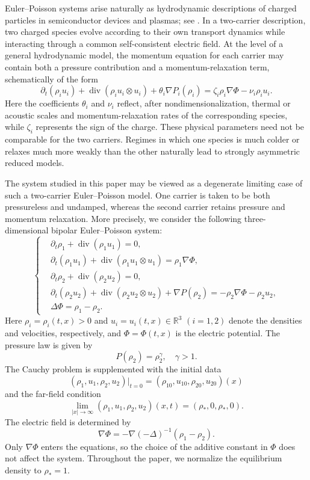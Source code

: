 \documentclass[10pt,reqno]{amsart}
\numberwithin{equation}{section}
\begin{document}
Euler--Poisson systems arise naturally as hydrodynamic descriptions of charged particles in semiconductor devices and plasmas; see \cite{MRS90}. In a two-carrier description, two charged species evolve according to their own transport dynamics while interacting through a common self-consistent electric field. At the level of a general hydrodynamic model, the momentum equation for each carrier may contain both a pressure contribution and a momentum-relaxation term, schematically of the form
\[
\partial_t(\rho_i u_i) +\operatorname{div}(\rho_i u_i\otimes u_i) +\theta_i\nabla P_i(\rho_i) =\zeta_i\rho_i\nabla\Phi-\nu_i\rho_i u_i.
\]
Here the coefficients $\theta_i$ and $\nu_i$ reflect, after nondimensionalization, thermal or acoustic scales and momentum-relaxation rates of the corresponding species, while $\zeta_i$ represents the sign of the charge. These physical parameters need not be comparable for the two carriers. Regimes in which one species is much colder or relaxes much more weakly than the other naturally lead to strongly asymmetric reduced models.

The system studied in this paper may be viewed as a degenerate limiting case of such a two-carrier Euler--Poisson model. One carrier is taken to be both pressureless and undamped, whereas the second carrier retains pressure and momentum relaxation. More precisely, we consider the following three-dimensional bipolar Euler--Poisson system:
\begin{equation}\label{main1}
\left\{
\begin{aligned}
&\partial_t \rho_1+\operatorname{div}(\rho_1u_1)=0,\\
&\partial_t(\rho_1u_1)+\operatorname{div}(\rho_1u_1\otimes u_1) =\rho_1\nabla\Phi,\\
&\partial_t \rho_2+\operatorname{div}(\rho_2u_2)=0,\\
&\partial_t(\rho_2u_2)+\operatorname{div}(\rho_2u_2\otimes u_2) +\nabla P(\rho_2) =-\rho_2\nabla\Phi-\rho_2u_2,\\
&\Delta\Phi=\rho_1-\rho_2.
\end{aligned}
\right.
\end{equation}
Here $\rho_i=\rho_i(t,x)>0$ and $u_i=u_i(t,x)\in\mathbb R^3$ $(i=1,2)$ denote the densities and velocities, respectively, and $\Phi=\Phi(t,x)$ is the electric potential. The pressure law is given by
\[
P(\rho_2)=\rho_2^\gamma,\quad \gamma>1.
\]
The Cauchy problem is supplemented with the initial data
\[
(\rho_1,u_1,\rho_2,u_2)|_{t=0} =(\rho_{10},u_{10},\rho_{20},u_{20})(x)
\]
and the far-field condition
\[
\lim_{|x|\to\infty}(\rho_1,u_1,\rho_2,u_2)(x,t) =(\rho_*,0,\rho_*,0).
\]
The electric field is determined by
\[
\nabla\Phi=-\nabla(-\Delta)^{-1}(\rho_1-\rho_2).
\]
Only $\nabla\Phi$ enters the equations, so the choice of the additive constant in $\Phi$ does not affect the system. Throughout the paper, we normalize the equilibrium density to $\rho_*=1$.
\end{document}
